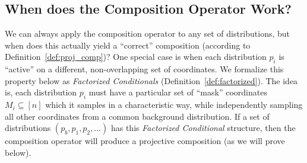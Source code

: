 \vspace{-0.5em}
\subsection{When does the Composition Operator Work?}
We can always apply the composition operator to any set of distributions,
but when does this actually yield a ``correct'' composition
(according to Definition~\ref{def:proj_comp})?
One special case is when each distribution $p_i$ is
``active'' on a different, non-overlapping set of coordinates.
We formalize this property below
as \emph{Factorized Conditionals} (Definition~\ref{def:factorized}).
The idea is, 
each distribution $p_i$
must have a particular set of ``mask'' coordinates $M_i \subseteq [n]$ which it
samples in a characteristic way,
while independently sampling all other coordinates
from a common background distribution.
If a set of distributions $(p_b, p_1, p_2, \ldots)$ has this
\emph{Factorized Conditional} structure, then 
the composition
operator will produce a projective composition (as we will prove below).




